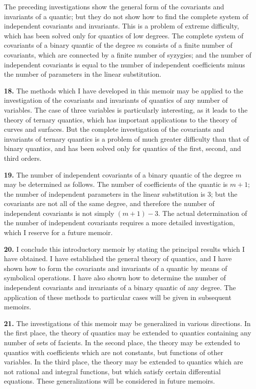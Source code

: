 \documentclass[12pt,a4paper]{article}
\begin{document}
The preceding investigations show the general form of the covariants and invariants of a quantic; but they do not show how to find the complete system of independent covariants and invariants. This is a problem of extreme difficulty, which has been solved only for quantics of low degrees. The complete system of covariants of a binary quantic of the degree $m$ consists of a finite number of covariants, which are connected by a finite number of syzygies; and the number of independent covariants is equal to the number of independent coefficients minus the number of parameters in the linear substitution.

\textbf{18.} The methods which I have developed in this memoir may be applied to the investigation of the covariants and invariants of quantics of any number of variables. The case of three variables is particularly interesting, as it leads to the theory of ternary quantics, which has important applications to the theory of curves and surfaces. But the complete investigation of the covariants and invariants of ternary quantics is a problem of much greater difficulty than that of binary quantics, and has been solved only for quantics of the first, second, and third orders.

\newpage
\setcounter{page}{232}

\textbf{19.} The number of independent covariants of a binary quantic of the degree $m$ may be determined as follows. The number of coefficients of the quantic is $m+1$; the number of independent parameters in the linear substitution is 3; but the covariants are not all of the same degree, and therefore the number of independent covariants is not simply $(m+1) - 3$. The actual determination of the number of independent covariants requires a more detailed investigation, which I reserve for a future memoir.

\textbf{20.} I conclude this introductory memoir by stating the principal results which I have obtained. I have established the general theory of quantics, and I have shown how to form the covariants and invariants of a quantic by means of symbolical operations. I have also shown how to determine the number of independent covariants and invariants of a binary quantic of any degree. The application of these methods to particular cases will be given in subsequent memoirs.

\newpage
\setcounter{page}{233}

\textbf{21.} The investigations of this memoir may be generalized in various directions. In the first place, the theory of quantics may be extended to quantics containing any number of sets of facients. In the second place, the theory may be extended to quantics with coefficients which are not constants, but functions of other variables. In the third place, the theory may be extended to quantics which are not rational and integral functions, but which satisfy certain differential equations. These generalizations will be considered in future memoirs.
\end{document}
